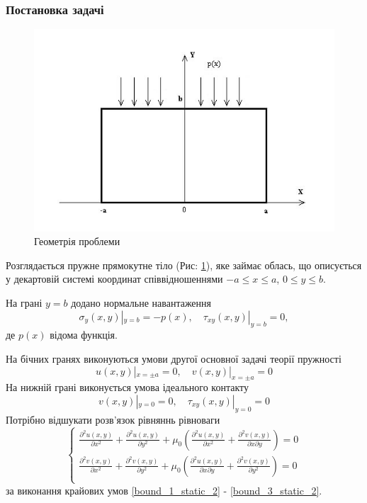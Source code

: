\subsubsection{Постановка задачі}
\begin{figure}[ht!]
    \begin{center}
        \includegraphics[scale=1]{images/geometry/image_1.jpg}
    \end{center}
    \caption{Геометрія проблеми}\label{geom_static_2}
\end{figure}
Розглядається пружне прямокутне тіло (Рис: \ref{geom_static_2}), яке займає облась,
що описується у декартовій системі координат співвідношеннями $-a \le x \le a$, $0 \le y \le b$.

На грані $y=b$ додано нормальне навантаження
\begin{equation}\label{bound_1_static_2}
    \sigma_y(x, y) |_{y=b} = -p(x), \quad  \tau_{xy}(x,y) |_{y=b} =0,
\end{equation}
де $p(x)$ відома функція.

На бічних гранях виконуються умови другої основної задачі теорії пружності
\begin{equation}\label{bound_2_static_2}
    u(x,y) |_{x=\pm a} = 0, \quad v(x,y) |_{x=\pm a} =0
\end{equation}
На нижній грані виконується умова ідеального контакту
\begin{equation}\label{bound_3_static_2}
    v(x,y) |_{y=0} = 0, \quad \tau_{xy}(x,y) |_{y=0} =0
\end{equation}
Потрібно відшукати розв'язок рівняннь рівноваги
\begin{equation}\label{lame_static_2}
    \begin{cases}
        \frac{\partial^2 u(x,y)}{\partial x^2} + \frac{\partial^2 u(x,y)}{\partial y^2} + \mu_0 (\frac{\partial^2 u(x,y)}{\partial x^2} + \frac{\partial^2 v(x,y)}{\partial x\partial y}) = 0 \\
        \frac{\partial^2 v(x,y)}{\partial x^2} + \frac{\partial^2 v(x,y)}{\partial y^2} + \mu_0 (\frac{\partial^2 u(x,y)}{\partial x \partial y} + \frac{\partial^2 v(x,y)}{\partial y^2}) = 0 \\
    \end{cases}
\end{equation}
за виконання крайових умов \eqref{bound_1_static_2} - \eqref{bound_3_static_2}.

